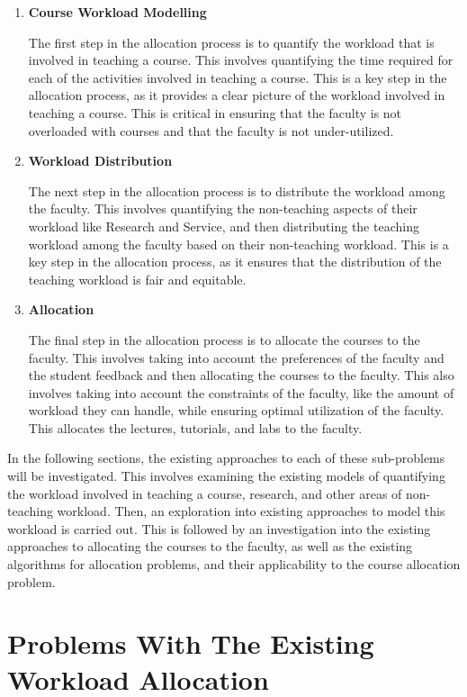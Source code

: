 \begin{enumerate}
  \item \textbf{Course Workload Modelling}

        The first step in the allocation process is to quantify the workload that is involved in teaching a course. This involves quantifying the time required for each of the activities involved in teaching a course. This is a key step in the allocation process, as it provides a clear picture of the workload involved in teaching a course. This is critical in ensuring that the faculty is not overloaded with courses and that the faculty is not under-utilized.

  \item \textbf{Workload Distribution}

        The next step in the allocation process is to distribute the workload among the faculty. This involves quantifying the non-teaching aspects of their workload like Research and Service, and then distributing the teaching workload among the faculty based on their non-teaching workload. This is a key step in the allocation process, as it ensures that the distribution of the teaching workload is fair and equitable.

  \item \textbf{Allocation}

        The final step in the allocation process is to allocate the courses to the faculty. This involves taking into account the preferences of the faculty and the student feedback and then allocating the courses to the faculty. This also involves taking into account the constraints of the faculty, like the amount of workload they can handle, while ensuring optimal utilization of the faculty. This allocates the lectures, tutorials, and labs to the faculty.

\end{enumerate}

In the following sections, the existing approaches to each of these sub-problems will be investigated. This involves examining the existing models of quantifying the workload involved in teaching a course, research, and other areas of non-teaching workload. Then, an exploration into existing approaches to model this workload is carried out. This is followed by an investigation into the existing approaches to allocating the courses to the faculty, as well as the existing algorithms for allocation problems, and their applicability to the course allocation problem.

\section{Problems With The Existing Workload Allocation}

